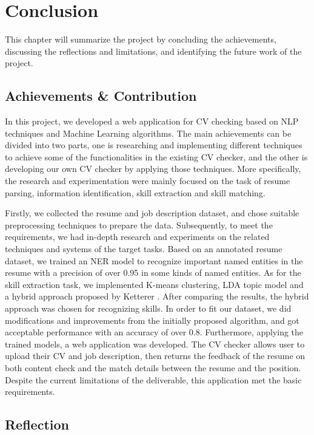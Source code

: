 \chapter{Conclusion}
\label{ch:conclusion}
This chapter will summarize the project by concluding the achievements, discussing the reflections and limitations, and identifying the future work of the project. 


\section{Achievements \& Contribution}

In this project, we developed a web application for CV checking based on NLP techniques and Machine Learning algorithms. The main achievements can be divided into two parts, one is researching and implementing different techniques to achieve some of the functionalities in the existing CV checker, and the other is developing our own CV checker by applying those techniques. More specifically, the research and experimentation were mainly focused on the task of resume parsing, information identification, skill extraction and skill matching.

Firstly, we collected the resume and job description dataset, and chose suitable preprocessing techniques to prepare the data. Subsequently, to meet the requirements, we had in-depth research and experiments on the related techniques and systems of the target tasks. Based on an annotated resume dataset, we trained an NER model to recognize important named entities in the resume with a precision of over 0.95 in some kinds of named entities. As for the skill extraction task, we implemented K-means clustering, LDA topic model and a hybrid approach proposed by Ketterer \cite{ketterer}. After comparing the results, the hybrid approach was chosen for recognizing skills. In order to fit our dataset, we did modifications and improvements from the initially proposed algorithm, and got acceptable performance with an accuracy of over 0.8. Furthermore, applying the trained models, a web application was developed. The CV checker allows user to upload their CV and job description, then returns the feedback of the resume on both content check and the match details between the resume and the position. Despite the current limitations of the deliverable, this application met the basic requirements. 



\section{Reflection}

